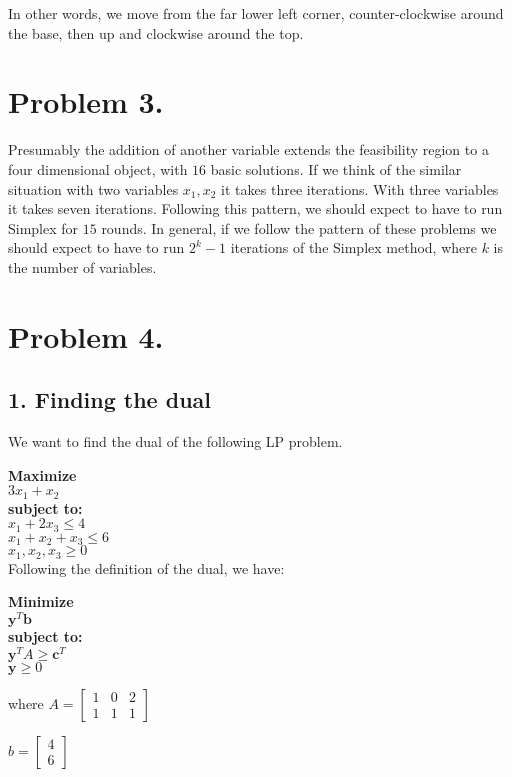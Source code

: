 \documentclass[12pt]{report}
\begin{document}
In other words, we move from the far lower left corner, counter-clockwise around the base, then up and clockwise around the top.

\section*{Problem 3.}

Presumably the addition of another variable extends the feasibility region to a four dimensional object, with $16$ basic solutions. If we think of the similar situation with two variables $x_1,x_2$ it takes three iterations. With three variables it takes seven iterations. Following this pattern, we should expect to have to run Simplex for $15$ rounds. In general, if we follow the pattern of these problems we should expect to have to run $2^k-1$ iterations of the Simplex method, where $k$ is the number of variables.

\section*{Problem 4.}

\subsection*{1. Finding the dual}

We want to find the dual of the following LP problem.

\textbf{Maximize}\\
  $3x_1 + x_2$\\
\textbf{subject to:}\\
  $ x_1 + 2x_3 \le 4 $ \\
  $ x_1 + x_2 + x_3\le 6 $ \\
  $ x_1,x_2,x_3 \ge 0 $ \\

Following the definition of the dual, we have:

\textbf{Minimize}\\
  $\textbf{y}^T \textbf{b} $\\
\textbf{subject to:}\\
  $ \textbf{y}^T A \ge \textbf{c}^T $ \\
  $ \textbf{y} \ge 0 $ 

where $A =
\begin{bmatrix}
  1 & 0 & 2 \\
  1 & 1 & 1 
\end{bmatrix}
\quad 
$

$
b =
\begin{bmatrix}
  4 \\
  6 
\end{bmatrix}
\quad 
$
\end{document}
